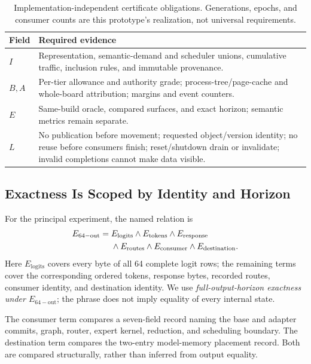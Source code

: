 \documentclass[letterpaper,twocolumn,10pt]{article}
\begin{document}
\begin{table}[t]
  \centering
  \small
  \caption{Implementation-independent certificate obligations.  Generations,
  epochs, and consumer counts are this prototype's realization, not universal
  requirements.}
  \label{tab:contract}
  \begin{tabularx}{\columnwidth}{@{}p{}X@{}}
    \toprule
    Field & Required evidence \\
    \midrule
    $I$ & Representation, semantic-demand and scheduler unions, cumulative
      traffic, inclusion rules, and immutable provenance. \\
    $B,A$ & Per-tier allowance and authority grade; process-tree/page-cache and
      whole-board attribution; margins and event counters. \\
    $E$ & Same-build oracle, compared surfaces, and exact horizon; semantic
      metrics remain separate. \\
    $L$ & No publication before movement; requested object/version identity;
      no reuse before consumers finish; reset/shutdown drain or invalidate;
      invalid completions cannot make data visible. \\
    \bottomrule
  \end{tabularx}
\end{table}

\subsection{Exactness Is Scoped by Identity and Horizon}

For the principal experiment, the named relation is
\begin{align}
E_{\mathrm{64-out}}={}&E_{\mathrm{logits}}\land E_{\mathrm{tokens}}
  \land E_{\mathrm{response}}\notag\\
 &{}\land E_{\mathrm{routes}}\land E_{\mathrm{consumer}}
  \land E_{\mathrm{destination}}.
\end{align}
Here $E_{\mathrm{logits}}$ covers every byte of all 64 complete logit rows;
the remaining terms cover the corresponding ordered tokens, response bytes,
recorded routes, consumer identity, and destination identity.
We use \emph{full-output-horizon exactness under $E_{\mathrm{64-out}}$}; the
phrase does not imply equality of every internal state.

The consumer term compares a seven-field record naming the base and adapter
commits, graph, router, expert kernel, reduction, and scheduling boundary.  The
destination term compares the two-entry model-memory placement record.  Both
are compared structurally, rather than inferred from output equality.
\end{document}
